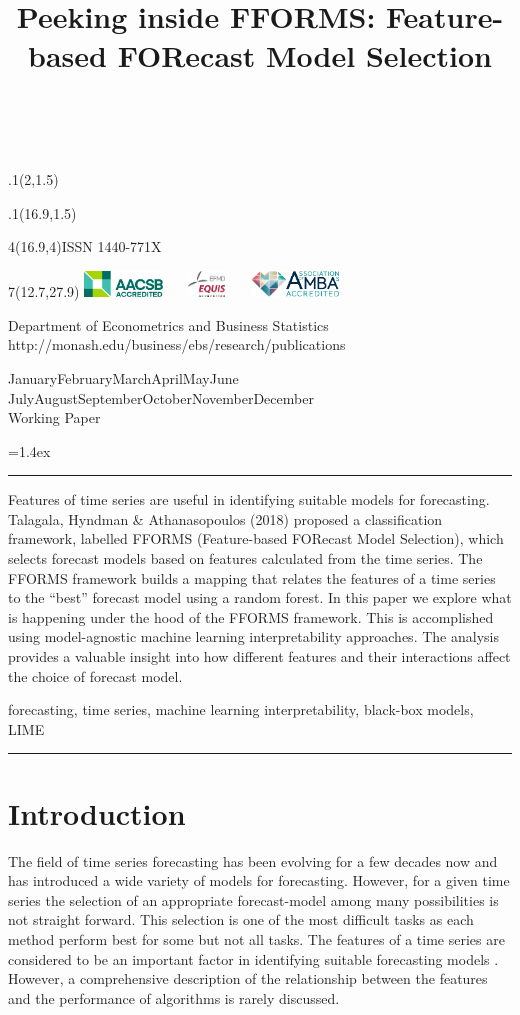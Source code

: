 \documentclass[11pt,a4paper,]{article}
\title{Peeking inside FFORMS: Feature-based FORecast Model Selection}
\date{\sf\Date~\Month~\Year}
\makeatletter
\def\Date{\number\day}
\def\Month{\ifcase\month\or
 January\or February\or March\or April\or May\or June\or
 July\or August\or September\or October\or November\or December\fi}
\def\Year{\number\year}
\def\showjel{{\large\textsf{\textbf{JEL classification:}}~\@jel}}
\def\cover{{\sffamily\setcounter{page}{0}
        \thispagestyle{empty}
        \placefig{2}{1.5}{width=5cm}{monash2}
        \placefig{16.9}{1.5}{width=2.1cm}{MBusSchool}
        \begin{textblock}{4}(16.9,4)ISSN 1440-771X\end{textblock}
        \begin{textblock}{7}(12.7,27.9)\hfill
        \includegraphics[height=0.7cm]{AACSB}~~~
        \includegraphics[height=0.7cm]{EQUIS}~~~
        \includegraphics[height=0.7cm]{AMBA}
        \end{textblock}
        \vspace*{2cm}
        \begin{center}\Large
        Department of Econometrics and Business Statistics\\[.5cm]
        \footnotesize http://monash.edu/business/ebs/research/publications
        \end{center}\vspace{2cm}
        \begin{center}
        \fbox{\parbox{14cm}{\begin{onehalfspace}\centering\Huge\vspace*{0.3cm}
                \textsf{\textbf{\expandafter{\@title}}}\vspace{1cm}\par
                \LARGE\@author\end{onehalfspace}
        }}
        \end{center}
        \vfill
                \begin{center}\Large
                \Month~\Year\\[1cm]
                Working Paper \@wp
        \end{center}\vspace*{2cm}}}
\def\pageone{{\sffamily\setstretch{1}%
        \thispagestyle{empty}%
        \vbox to \textheight{%
        \raggedright\baselineskip=1.2cm
     {\fontsize{24.88}{30}\sffamily\textbf{\expandafter{\@title}}}
        \vspace{2cm}\par
        \hspace{1cm}\parbox{14cm}{\sffamily\large\@addresses}\vspace{1cm}\vfill
        \hspace{1cm}{\large\Date~\Month~\Year}\\[1cm]
        \hspace{1cm}\showjel\vss}}}
\def\blindtitle{{\sffamily
     \thispagestyle{plain}\raggedright\baselineskip=1.2cm
     {\fontsize{24.88}{30}\sffamily\textbf{\expandafter{\@title}}}\vspace{1cm}\par
        }}
\def\titlepage{{\cover\newpage\pageone\newpage\blindtitle}}
\let\maketitle\titlepage
\newenvironment{keywords}{\par\vspace{0.5cm}\noindent{\sffamily\textbf{Keywords:}}}{\vspace{0.25cm}\par\hrule\vspace{0.5cm}\par}
\renewenvironment{abstract}{\begin{minipage}{\textwidth}\parskip=1.4ex\noindent
\hrule\vspace{0.1cm}\par{\sffamily\textbf{\abstractname}}\newline}
  {\end{minipage}}
\def\placefig#1#2#3#4{\begin{textblock}{.1}(#1,#2)\rlap{\texttt{[image: \#4]}}\end{textblock}}
\makeatother
\begin{document}
\maketitle
\begin{abstract}
Features of time series are useful in identifying suitable models for forecasting. Talagala, Hyndman \& Athanasopoulos (2018) proposed a classification framework, labelled FFORMS (Feature-based FORecast Model Selection), which selects forecast models based on features calculated from the time series. The FFORMS framework builds a mapping that relates the features of a time series to the ``best'' forecast model using a random forest. In this paper we explore what is happening under the hood of the FFORMS framework. This is accomplished using model-agnostic machine learning interpretability approaches. The analysis provides a valuable insight into how different features and their interactions affect the choice of forecast model.
\end{abstract}
\begin{keywords}
forecasting, time series, machine learning interpretability, black-box models, LIME
\end{keywords}

\hypertarget{intro}{%
\section{Introduction}\label{intro}}

The field of time series forecasting has been evolving for a few decades now and has introduced a wide variety of models for forecasting. However, for a given time series the selection of an appropriate forecast-model among many possibilities is not straight forward. This selection is one of the most difficult tasks as each method perform best for some but not all tasks. The features of a time series are considered to be an important factor in identifying suitable forecasting models \autocites{collopy1992rule}{meade2000evidence}{makridakis2000m3}{wang2009rule}. However, a comprehensive description of the relationship between the features and the performance of algorithms is rarely discussed.
\end{document}
